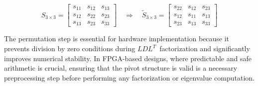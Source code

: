 \[
S_{3\times3} =
\begin{bmatrix}
s_{11} & s_{12} & s_{13} \\
s_{12} & s_{22} & s_{23} \\
s_{13} & s_{23} & s_{33}
\end{bmatrix}
\quad\Longrightarrow\quad
\tilde{S}_{3\times3} =
\begin{bmatrix}
s_{22} & s_{12} & s_{23} \\
s_{12} & s_{11} & s_{13} \\
s_{23} & s_{13} & s_{33}
\end{bmatrix}
\]

The permutation step is essential for hardware implementation because it prevents division by zero conditions during $LDL^{T}\,$ factorization and significantly improves numerical stability. In FPGA-based designs, where predictable and safe arithmetic is crucial, ensuring that the pivot structure is valid is a necessary preprocessing step before performing any factorization or eigenvalue computation.

